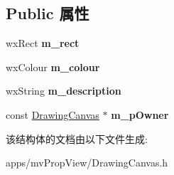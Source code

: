 \subsection*{Public 属性}
\begin{DoxyCompactItemize}
\item 
\hypertarget{struct_a_o_i_abd230dd66871955f8fbfd8b698b73012}{wx\+Rect {\bfseries m\+\_\+rect}}\label{struct_a_o_i_abd230dd66871955f8fbfd8b698b73012}

\item 
\hypertarget{struct_a_o_i_ae15ac93ca34d9f276728fd929727597a}{wx\+Colour {\bfseries m\+\_\+colour}}\label{struct_a_o_i_ae15ac93ca34d9f276728fd929727597a}

\item 
\hypertarget{struct_a_o_i_aab112129d3312321fc875267fca2482d}{wx\+String {\bfseries m\+\_\+description}}\label{struct_a_o_i_aab112129d3312321fc875267fca2482d}

\item 
\hypertarget{struct_a_o_i_a5cb2e94c3b7e607759e1c058deb5a7aa}{const \hyperlink{class_drawing_canvas}{Drawing\+Canvas} $\ast$ {\bfseries m\+\_\+p\+Owner}}\label{struct_a_o_i_a5cb2e94c3b7e607759e1c058deb5a7aa}

\end{DoxyCompactItemize}


该结构体的文档由以下文件生成\+:\begin{DoxyCompactItemize}
\item 
apps/mv\+Prop\+View/Drawing\+Canvas.\+h\end{DoxyCompactItemize}
